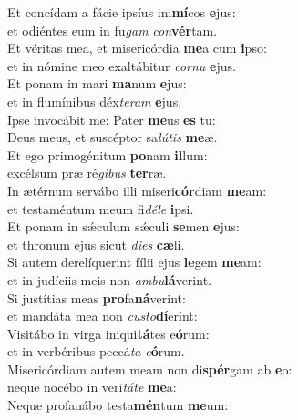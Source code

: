 \oddverse Et concídam a fácie ipsíus ini\textbf{mí}cos \textbf{e}jus:~\*\\
\oddverse et odiéntes eum in fu\textit{gam} \textit{con}\textbf{vér}tam.\\
\evenverse Et véritas mea, et misericórdia \textbf{me}a cum \textbf{i}pso:~\*\\
\evenverse et in nómine meo exaltábitur \textit{cor}\textit{nu} \textbf{e}jus.\\
\oddverse Et ponam in mari \textbf{ma}num \textbf{e}jus:~\*\\
\oddverse et in flumínibus déx\textit{te}\textit{ram} \textbf{e}jus.\\
\evenverse Ipse invocábit me: Pater \textbf{me}us \textbf{es} tu:~\*\\
\evenverse Deus meus, et suscéptor sa\textit{lú}\textit{tis} \textbf{me}æ.\\
\oddverse Et ego primogénitum \textbf{po}nam \textbf{il}lum:~\*\\
\oddverse excélsum præ ré\textit{gi}\textit{bus} \textbf{ter}ræ.\\
\evenverse In ætérnum servábo illi miseri\textbf{cór}diam \textbf{me}am:~\*\\
\evenverse et testaméntum meum fi\textit{dé}\textit{le} \textbf{i}psi.\\
\oddverse Et ponam in sǽculum sǽculi \textbf{se}men \textbf{e}jus:~\*\\
\oddverse et thronum ejus sicut \textit{di}\textit{es} \textbf{cæ}li.\\
\evenverse Si autem derelíquerint fílii ejus \textbf{le}gem \textbf{me}am:~\*\\
\evenverse et in judíciis meis non \textit{am}\textit{bu}\textbf{lá}verint.\\
\oddverse Si justítias meas \textbf{pro}fa\textbf{ná}verint:~\*\\
\oddverse et mandáta mea non \textit{cu}\textit{sto}\textbf{dí}erint:\\
\evenverse Visitábo in virga iniqui\textbf{tá}tes e\textbf{ó}rum:~\*\\
\evenverse et in verbéribus peccá\textit{ta} \textit{e}\textbf{ó}rum.\\
\oddverse Misericórdiam autem meam non di\textbf{spér}gam ab \textbf{e}o:~\*\\
\oddverse neque nocébo in veri\textit{tá}\textit{te} \textbf{me}a:\\
\evenverse Neque profanábo testa\textbf{mén}tum \textbf{me}um:~\*\\
